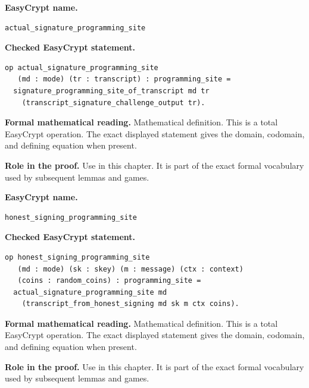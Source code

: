 \begin{formaldefinition}
\noindent\textbf{EasyCrypt name.}
\begin{lstlisting}[language=EasyCrypt,basicstyle=\ttfamily\scriptsize]
actual_signature_programming_site
\end{lstlisting}
\noindent\textbf{Checked EasyCrypt statement.}
\begin{lstlisting}[language=EasyCrypt,basicstyle=\ttfamily\scriptsize]
op actual_signature_programming_site
   (md : mode) (tr : transcript) : programming_site =
  signature_programming_site_of_transcript md tr
    (transcript_signature_challenge_output tr).
\end{lstlisting}
\noindent\textbf{Formal mathematical reading.}
Mathematical definition. This is a total EasyCrypt operation.  The exact displayed statement gives the domain, codomain, and defining equation when present.

\noindent\textbf{Role in the proof.}
Use in this chapter. It is part of the exact formal vocabulary used by subsequent lemmas and games.

\end{formaldefinition}

\begin{formaldefinition}
\noindent\textbf{EasyCrypt name.}
\begin{lstlisting}[language=EasyCrypt,basicstyle=\ttfamily\scriptsize]
honest_signing_programming_site
\end{lstlisting}
\noindent\textbf{Checked EasyCrypt statement.}
\begin{lstlisting}[language=EasyCrypt,basicstyle=\ttfamily\scriptsize]
op honest_signing_programming_site
   (md : mode) (sk : skey) (m : message) (ctx : context)
   (coins : random_coins) : programming_site =
  actual_signature_programming_site md
    (transcript_from_honest_signing md sk m ctx coins).
\end{lstlisting}
\noindent\textbf{Formal mathematical reading.}
Mathematical definition. This is a total EasyCrypt operation.  The exact displayed statement gives the domain, codomain, and defining equation when present.

\noindent\textbf{Role in the proof.}
Use in this chapter. It is part of the exact formal vocabulary used by subsequent lemmas and games.

\end{formaldefinition}

